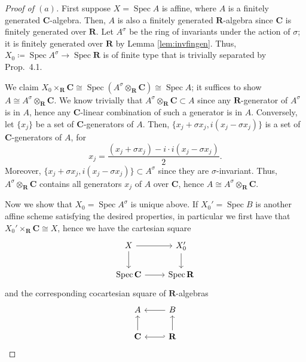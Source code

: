 \documentclass[10pt]{article}
\theoremstyle{definition}
\theoremstyle{remark}
\numberwithin{equation}{section}
\numberwithin{figure}{subsubsection}
\DeclareMathOperator{\Spec}{Spec}
\begin{document}
\begin{proof}[Proof of $(a)$]
  First suppose $X = \Spec A$ is affine, where $A$ is a finitely generated
  $\mathbf{C}$-algebra. Then, $A$ is also a finitely generated
  $\mathbf{R}$-algebra since $\mathbf{C}$ is finitely generated over
  $\mathbf{R}$. Let $A^\sigma$ be the ring of invariants under the
  action of $\sigma$; it is finitely generated over $\mathbf{R}$ by Lemma
  \ref{lem:invfingen}. Thus, $X_0 \coloneqq \Spec A^\sigma \to \Spec
  \mathbf{R}$ is of finite type that is trivially separated by Prop.\ 4.1.
  \par We claim $X_0 \times_{\mathbf{R}} \mathbf{C} \cong \Spec(A^\sigma
  \otimes_{\mathbf{R}} \mathbf{C}) \cong \Spec A$; it suffices to show $A \cong
  A^\sigma \otimes_\mathbf{R} \mathbf{C}$. We know trivially that $A^\sigma
  \otimes_\mathbf{R} \mathbf{C} \subset A$ since any $\mathbf{R}$-generator of
  $A^\sigma$ is in $A$, hence any $\mathbf{C}$-linear combination of such a
  generator is in $A$. Conversely, let $\{x_j\}$ be a set of
  $\mathbf{C}$-generators of $A$. Then, $\{x_j + \sigma x_j,i(x_j - \sigma x_j)\}$
  is a set of $\mathbf{C}$-generators of $A$, for
  \begin{equation*}
    x_j = \frac{(x_j + \sigma x_j) - i\cdot i(x_j - \sigma x_j)}{2}.
  \end{equation*}
  Moreover, $\{x_j + \sigma x_j,i(x_j - \sigma x_j)\} \subset A^\sigma$ since
  they are $\sigma$-invariant. Thus, $A^\sigma \otimes_{\mathbf{R}} \mathbf{C}$
  contains all generators $x_j$ of $A$ over $\mathbf{C}$, hence $A \cong
  A^\sigma \otimes_\mathbf{R} \mathbf{C}$.
  \par Now we show that $X_0 = \Spec A^\sigma$ is unique above. If $X_0' = \Spec
  B$ is another affine scheme satisfying the desired properties, in particular
  we first have that $X_0' \times_\mathbf{R} \mathbf{C} \cong X$, hence we have the
  cartesian square
  \begin{equation*}
    \begin{tikzcd}
      X \rar\dar & X_0'\dar\\
      \Spec \mathbf{C} \rar & \Spec \mathbf{R}
    \end{tikzcd}
  \end{equation*}
  and the corresponding cocartesian square of $\mathbf{R}$-algebras
  \begin{equation}\label{eq:cocart}
    \begin{tikzcd}
      A & \lar B\\
      \mathbf{C} \uar & \lar[hook']\uar \mathbf{R}

\end{tikzcd}
\end{equation}
\end{proof}
\end{document}
